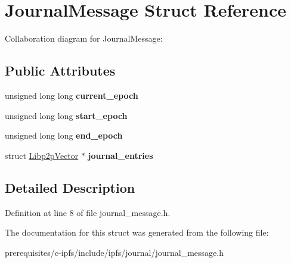 \hypertarget{struct_journal_message}{}\section{Journal\+Message Struct Reference}
\label{struct_journal_message}


Collaboration diagram for Journal\+Message\+:
\subsection*{Public Attributes}
\begin{DoxyCompactItemize}
\item 
\mbox{\label{struct_journal_message_a9e2293c42f4cdc62ed42cd19ca80d6f3}} 
unsigned long long {\bfseries current\+\_\+epoch}
\item 
\mbox{\label{struct_journal_message_a8369e4299b3c1fe68fff2014bdc45520}} 
unsigned long long {\bfseries start\+\_\+epoch}
\item 
\mbox{\label{struct_journal_message_a78313dfca260e0dfcef507662dd6a6a9}} 
unsigned long long {\bfseries end\+\_\+epoch}
\item 
\mbox{\label{struct_journal_message_a822b5986afe32d1632f43ceb432ed7bd}} 
struct \mbox{\hyperlink{struct_libp2p_vector}{Libp2p\+Vector}} $\ast$ {\bfseries journal\+\_\+entries}
\end{DoxyCompactItemize}


\subsection{Detailed Description}


Definition at line 8 of file journal\+\_\+message.\+h.



The documentation for this struct was generated from the following file\+:\begin{DoxyCompactItemize}
\item 
prerequisites/c-\/ipfs/include/ipfs/journal/journal\+\_\+message.\+h\end{DoxyCompactItemize}
